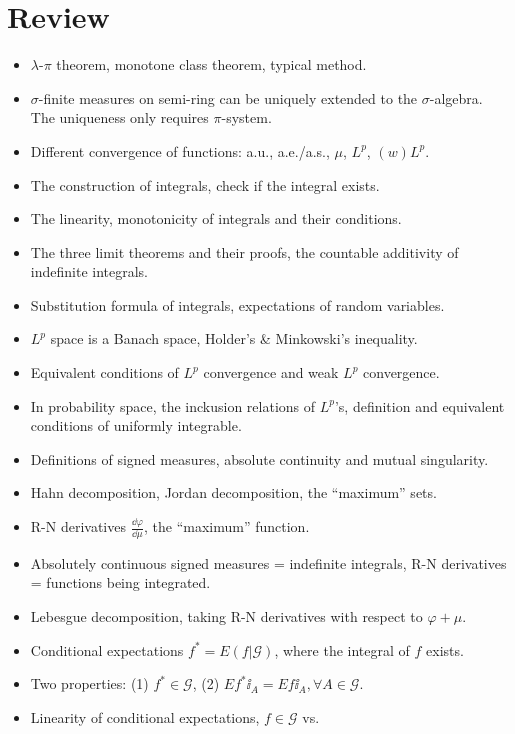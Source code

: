 \section{Review}
\label{sec:Review}
\begin{itemize}
	\item $\lambda$-$\pi$ theorem, monotone class theorem, typical method.
	\item  $\sigma$-finite measures on semi-ring can be uniquely
		extended to the $\sigma$-algebra.
		The uniqueness only requires $\pi$-system.
	\item Different convergence of functions:
		a.u., a.e./a.s., $\mu$, $L^p$, $(w)L^p$.
	\item The construction of integrals, check if the integral exists.
	\item The linearity, monotonicity of integrals and their conditions.
	\item The three limit theorems and their proofs,
		the countable additivity of indefinite integrals.
	\item Substitution formula of integrals, expectations of random variables.
	\item $L^p$ space is a Banach space, Holder's \& Minkowski's inequality.
	\item Equivalent conditions of $L^p$ convergence and weak $L^p$ convergence.
	\item In probability space, the inckusion relations of $L^p$'s,
		definition and equivalent conditions of uniformly integrable.
	\item Definitions of signed measures, absolute continuity and mutual singularity.
	\item Hahn decomposition, Jordan decomposition, the ``maximum'' sets.
	\item R-N derivatives $\frac{\dd \varphi}{\dd \mu}$, the ``maximum'' function.
	\item Absolutely continuous signed measures = indefinite integrals,
		R-N derivatives = functions being integrated.
	\item Lebesgue decomposition, taking R-N derivatives with respect to $\varphi + \mu$.
	\item Conditional expectations $f^* = E(f|\mathscr{G})$, where
		the integral of $f$ exists.
	\item Two properties: (1) $f^*\in \mathscr{G}$,
		(2) $Ef^*\ii_A = Ef\ii_A, \forall A\in \mathscr{G}$.
	\item Linearity of conditional expectations, $f\in \mathscr{G}$ vs.

\end{itemize}
